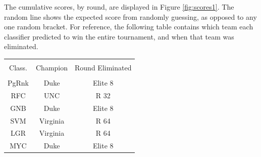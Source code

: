 The cumulative scores, by round, are displayed in Figure \ref{fig:scores1}.  
The random line shows the expected score from randomly guessing, as opposed to any one random bracket.  
For reference, the following table contains which team each classifier predicted to win the entire tournament, and when that team was eliminated.\newline\newline
\begin{tabular}{|c|c|c|}
\hline \\
Class. & Champion & Round Eliminated \\
\hline \\
PgRnk & Duke & Elite 8 \\
RFC & UNC & R 32 \\
GNB & Duke & Elite 8 \\
SVM & Virginia & R 64 \\
LGR & Virginia & R 64  \\
MYC & Duke & Elite 8 \\
\hline
\end{tabular}

